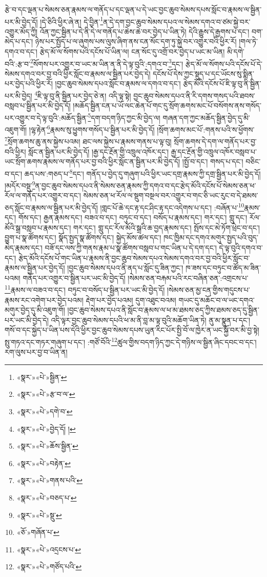 རྩེ་བ་དང་ལྡན་པ་སེམས་ཅན་རྣམས་ལ་གནོད་པ་དང་ལྡན་པ་དེ་ཡང་བྱང་ཆུབ་སེམས་དཔས་སློང་བ་རྣམས་ལ་སྦྱིན་པར་མི་བྱེད་དོ། །དེ་ཅིའི་ཕྱིར་ཞེ་ན། དེ་བྱིན་\footnote{«སྣར་»«པེ་»སྦྱིན་}ན་དེ་དག་བྱང་ཆུབ་སེམས་དཔའ་ལ་སེམས་དགའ་བ་ཙམ་སྐྱེ་བར་འགྱུར་མོད་ཀྱི། འོན་ཀྱང་སྦྱིན་པ་དེ་ནི་དེ་ལ་གནོད་པ་ཆེས་ཆེ་བར་བྱེད་པ་ཡིན་ཏེ། དེའི་རྒྱུས་དེ་རྒྱགས་པ་དང་། བག་མེད་པ་དང་། ཉེས་པར་སྤྱོད་པ་ལ་ཞུགས་པས་ལུས་ཞིག་ནས་ངན་སོང་དག་ཏུ་སྐྱེ་བར་འགྱུར་བའི་ཕྱིར་རོ། །གལ་ཏེ་དགའ་བ་དང་། རྩེད་མོ་ལ་སོགས་པའི་དངོས་པོ་ཡིན་ལ། ངན་སོང་དུ་འགྲོ་བར་བྱེད་པ་ཡང་མ་ཡིན། མི་དགེ་བའི་:རྩ་བ་\footnote{«སྣར་»«པེ་»རྩ་བ་ལ་}སོགས་པར་འགྱུར་བ་ཡང་མ་ཡིན་ན་ནི་དེ་ལྟ་བུའི་:དགའ་བ་\footnote{«སྣར་»«པེ་»དགེ་བ་}དང་། རྩེད་མོ་ལ་སོགས་པའི་དངོས་པོ་དེ་སེམས་དགའ་བར་བྱ་བའི་ཕྱིར་སློང་བ་རྣམས་ལ་སྦྱིན་པར་བྱེད་དེ། དངོས་པོ་དེས་ཀྱང་སྡུད་པ་དང་ཡོངས་སུ་སྨིན་པར་བྱེད་པའི་ཕྱིར་རོ། །བྱང་ཆུབ་སེམས་དཔའ་སློང་བ་རྣམས་ལ་དགའ་བ་དང་། རྩེད་མོའི་དངོས་པོ་ཇི་ལྟ་བུ་ནི་སྦྱིན་པར་མི་བྱེད། \footnote{«སྣར་»«པེ་»བྱེད་དོ། ། }ཇི་ལྟ་བུ་ནི་སྦྱིན་པར་བྱེད་ཅེ་ན། འདི་ལྟ་སྟེ། བྱང་ཆུབ་སེམས་དཔའ་ནི་རི་དགས་གསད་པའི་ཐབས་བསླབ་པ་སྦྱིན་པར་མི་བྱེད་དོ། །མཆོད་སྦྱིན་ངན་པ་ཡོ་ལང་ཆེན་པོ་གང་དུ་སྲོག་ཆགས་མང་པོ་བསོགས་ནས་གསོད་པར་འགྱུར་བ་དེ་ལྟ་བུའི་:མཆོད་སྦྱིན་\footnote{«སྣར་»«པེ་»ཆོས་སྦྱིན་}དག་བདག་ཉིད་ཀྱང་མི་བྱེད་ལ། གཞན་དག་ཀྱང་མཆོད་སྦྱིན་བྱེད་དུ་མི་འཇུག་གོ། །ལྷ་རྟེན་\footnote{«སྣར་»«པེ་»བརྟེན་}རྣམས་སུ་ཕྱུགས་གསོད་པ་སྦྱིན་པར་མི་བྱེད་དོ། །སྲོག་ཆགས་མང་པོ་:གནས་པའི་ས་ཕྱོགས་\footnote{«སྣར་»«པེ་»གནས་པའི་}སྲོག་ཆགས་ཆུ་ནས་སྐྱེས་པའམ། ཐང་ལས་སྐྱེས་པ་རྣམས་གནས་པ་ལྟ་བུ། སྲོག་ཆགས་དེ་དག་ལ་གནོད་པར་བྱ་བའི་ཕྱིར། སློང་ན་སྦྱིན་པར་མི་བྱེད་དོ། །རྒྱ་དང་རྔོན་གྱི་འཁྲུལ་འཁོར་དང་། རྒྱ་དང་རྔོན་གྱི་འཁྲུལ་འཁོར་བསླབ་པ་ཡང་སྲོག་ཆགས་རྣམས་ལ་གནོད་པར་བྱ་བའི་ཕྱིར་སློང་ན་སྦྱིན་པར་མི་བྱེད་དོ། །སྤྱོ་བ་དང་། གསད་པ་དང་། བཅིང་བ་དང་། ཆད་པས་:གཅད་པ་\footnote{«སྣར་»«པེ་»བཅད་པ་}དང་། གནོད་པ་བྱེད་དུ་གཞུག་པའི་ཕྱིར་ཡང་དགྲ་རྣམས་ཀྱི་དགྲ་སྦྱིན་པར་མི་བྱེད་དོ། །མདོར་བསྡུ་\footnote{«སྣར་»«པེ་»སྡུ་}ན་བྱང་ཆུབ་སེམས་དཔའ་ནི་སེམས་ཅན་རྣམས་ཀྱི་དགའ་བ་དང་རྩེད་མོའི་དངོས་པོ་སེམས་ཅན་ཕ་རོལ་ལ་གནོད་པར་འགྱུར་བ་དང་། སེམས་ཅན་ཕ་རོལ་ལ་སྡུག་བསྔལ་བར་འགྱུར་བ་གང་ཅི་ཡང་རུང་བ་དེ་ཐམས་ཅད་སློང་བ་རྣམས་ལ་སྦྱིན་པར་མི་བྱེད་དོ། །གླང་པོ་ཆེ་དང་རྟ་དང་ཤིང་རྟ་དང་འདེགས་པ་དང་། :བཞོན་པ་\footnote{«ཅོ་»གཞོན་པ་}རྣམས་དང་། གོས་དང་། རྒྱན་རྣམས་དང་། བཟའ་བ་དང་། བཏུང་བ་དང་། བསོད་པ་རྣམས་དང་། གར་དང་། གླུ་དང་། རོལ་མོའི་སྒྲ་བསླབ་པ་རྣམས་དང་། གར་དང་། གླུ་དང་རོལ་མོའི་སྒྲའི་ཆ་བྱད་རྣམས་དང་། སྤོས་དང་མེ་ཏོག་ཕྲེང་བ་དང་། བྱུག་པ་སྣ་ཚོགས་དང་། སྣོད་སྤྱད་སྣ་ཚོགས་དང་། སྐྱེད་མོས་ཚལ་དང་། ཁང་ཁྱིམ་དང་དགའ་མགུར་སྤྱད་པའི་བུད་མེད་རྣམས་དང་། བཟོ་དང་ལས་ཀྱི་གནས་རྣམ་པ་སྣ་ཚོགས་བསླབ་པ་གང་ཡིན་པ་དེ་དག་དང་། དེ་ལྟ་བུའི་དགའ་བ་དང་། རྩེད་མོའི་དངོས་པོ་གང་ཡིན་པ་རྣམས་ནི་བྱང་ཆུབ་སེམས་དཔའ་སེམས་དགའ་བར་བྱ་བའི་ཕྱིར་སློང་བ་རྣམས་ལ་སྦྱིན་པར་བྱེད་དོ། །བྱང་ཆུབ་སེམས་དཔའ་ནི་ནད་པ་སློང་དུ་ཟིན་ཀྱང་། ཁ་ཟས་དང་བཏུང་བ་ཚོད་མ་ཟིན་པའམ། གནོད་པར་འགྱུར་བ་སྦྱིན་པར་ཡང་མི་བྱེད་དོ། །སེམས་ཅན་བརྐམ་པའི་རང་བཞིན་ཅན་:འགྲངས་པ་\footnote{«སྣར་»«པེ་»འདྲངས་པ་}རྣམས་ལ་བཟའ་བ་དང་། བཏུང་བ་བསོད་པ་སྦྱིན་པར་ཡང་མི་བྱེད་དོ། །སེམས་ཅན་མྱ་ངན་གྱིས་གདུངས་པ་རྣམས་རང་འགེག་པར་བྱེད་པའམ། རྡེག་པར་བྱེད་པའམ། དུག་འཐུང་བའམ། གཡང་དུ་མཆོང་བ་ལ་ཡང་དགའ་མགུར་བྱེད་དུ་མི་འཇུག་གོ། །བྱང་ཆུབ་སེམས་དཔའ་ནི་སློང་བ་རྣམས་ལ་ཕ་མ་ཐམས་ཅད་ཀྱིས་ཐམས་ཅད་དུ་སྦྱིན་པར་ཡང་མི་བྱེད་དེ། འདི་ལྟར་བྱང་ཆུབ་སེམས་དཔའི་ཕ་མ་ནི་བླ་མ་ལྟ་བུའི་མཆོག་ཡིན་ཏེ། ནུ་མ་སྣུན་པ་དང་། གསོ་བ་དང་སྐྱེད་པ་ཡིན་པས་དེའི་ཕྱིར་བྱང་ཆུབ་སེམས་དཔས་ཡུན་རིང་པོར་སྤྱི་བོ་ལ་ཁྱེར་ན་ཡང་སྐྱོ་བར་མི་བྱ་སྟེ། སྤུ་གཏའ་དང་གཏར་གཞུག་པ་དང་། :གཙོ་བོའི་\footnote{«སྣར་»«པེ་»གཙོད་པའི་}ཚུལ་གྱིས་བདག་ཉིད་ཀྱང་དེ་གཉིས་ལ་སྦྱིན་ཞིང་དབང་བ་དང་། རག་ལུས་པར་བྱ་བ་ཡིན་ན། 